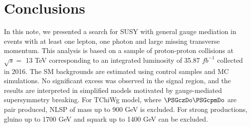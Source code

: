 \documentclass[thesis.tex]{subfiles}
\renewcommand\_{\textunderscore\allowbreak}
\begin{document}
\chapter{Conclusions}
\label{sec:conclusions}
In this note, we presented a search for SUSY with general gauge mediation in events with at least one lepton, one photon and large missing transverse momentum. This analysis is based on a sample of proton-proton collisions at $\sqrt{s} =$ 13 TeV corresponding to an integrated luminosity of 35.87 $fb^{-1}$ collected in 2016. The SM backgrounds are estimated using control samples and MC simulations. No significant excess was observed in the signal region, and the results are interpreted in simplified models motivated by gauge-mediated supersymmetry breaking. For TChiWg model, where $\PSGczDo\PSGcpmDo$ are pair produced, NLSP of mass up to 900 GeV is excluded. For strong productions, gluino up to 1700 GeV and squark up to 1400 GeV can be excluded. 
\end{document}
